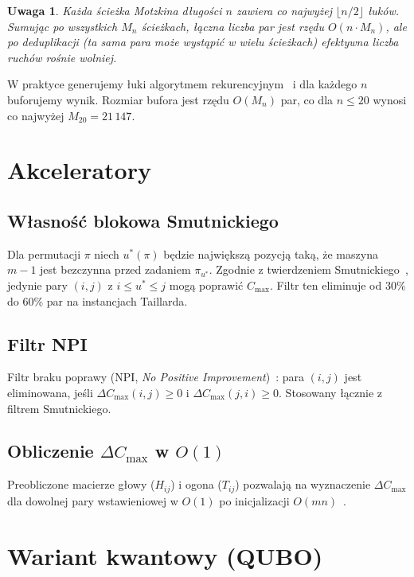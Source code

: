 \documentclass[12pt,a4paper]{article}
\newtheorem{uwaga}{Uwaga}
\begin{document}
\begin{uwaga}
Każda ścieżka Motzkina długości $n$ zawiera co najwyżej $\lfloor n/2 \rfloor$ łuków. Sumując po wszystkich $M_n$ ścieżkach, łączna liczba par jest rzędu $O(n \cdot M_n)$, ale po deduplikacji (ta sama para może wystąpić w wielu ścieżkach) efektywna liczba ruchów rośnie wolniej.
\end{uwaga}

W praktyce generujemy łuki algorytmem rekurencyjnym~\cite{motzkin_enum} i dla każdego $n$ buforujemy wynik. Rozmiar bufora jest rzędu $O(M_n)$ par, co dla $n \leq 20$ wynosi co najwyżej $M_{20} = 21\,147$.

\section{Akceleratory}

\subsection{Własność blokowa Smutnickiego}

Dla permutacji $\pi$ niech $u^*(\pi)$ będzie największą pozycją taką, że maszyna $m-1$ jest bezczynna przed zadaniem $\pi_{u^*}$. Zgodnie z twierdzeniem Smutnickiego~\cite{smutnicki}, jedynie pary $(i,j)$ z $i \leq u^* \leq j$ mogą poprawić $C_{\max}$. Filtr ten eliminuje od 30\% do 60\% par na instancjach Taillarda.

\subsection{Filtr NPI}

Filtr braku poprawy (NPI, \emph{No Positive Improvement})~\cite{wodecki04}: para $(i,j)$ jest eliminowana, jeśli $\Delta C_{\max}(i,j) \geq 0$ i $\Delta C_{\max}(j,i) \geq 0$. Stosowany łącznie z filtrem Smutnickiego.

\subsection{Obliczenie $\Delta C_{\max}$ w $O(1)$}

Preobliczone macierze głowy ($H_{ij}$) i ogona ($T_{ij}$) pozwalają na wyznaczenie $\Delta C_{\max}$ dla dowolnej pary wstawieniowej w $O(1)$ po inicjalizacji $O(mn)$~\cite{wodecki04}.

\section{Wariant kwantowy (QUBO)}
\end{document}
